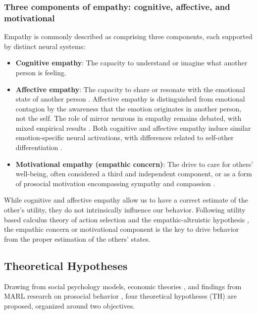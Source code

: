 \subsubsection{Three components of empathy: cognitive, affective, and motivational}
Empathy is commonly described as comprising three components, each supported by distinct neural systems:
\begin{itemize}
	\item \textbf{Cognitive empathy}: The capacity to understand or imagine what another person is feeling.
	\item \textbf{Affective empathy}: The capacity to share or resonate with the emotional state of another person \cite{bosnjakovicEmpathyConceptsTheories2018,dewaalMammalianEmpathyBehavioural2017}. Affective empathy is distinguished from emotional contagion by the awareness that the emotion originates in another person, not the self. The role of mirror neurons in empathy remains debated, with mixed empirical results \cite{bekkaliPutativeMirrorNeuron2021,boniniMirrorNeurons302022}. Both cognitive and affective empathy induce similar emotion-specific neural activations, with differences related to self-other differentiation \cite{bernhardtNeuralBasisEmpathy2012,dvashTheoryMindEmpathy2014}.
	\item \textbf{Motivational empathy (empathic concern)}: The drive to care for others' well-being, often considered a third and independent component, or as a form of prosocial motivation encompassing sympathy and compassion \cite{dewaalMammalianEmpathyBehavioural2017,decetyEmergenceEmpathyDevelopmental2021}.
\end{itemize}

While cognitive and affective empathy allow us to have a correct estimate of the other's utility, they do not intrinsically influence our behavior. Following utility based calculus theory of action selection and the empathic-altruistic hypothesis \cite{Batson01041991,batson2022empathy}, the empathic concern or motivational component is the key to drive behavior from the proper estimation of the others' states.

\subsection{Theoretical Hypotheses}
Drawing from social psychology models, economic theories \cite{lynneTheoreticalFoundationEmpathy2016,thiermannMotivatingIndividualsSocial2020}, and findings from MARL research on prosocial behavior \cite{yuEmotionalMultiagentReinforcement2015}, four theoretical hypotheses (TH) are proposed, organized around two objectives.


